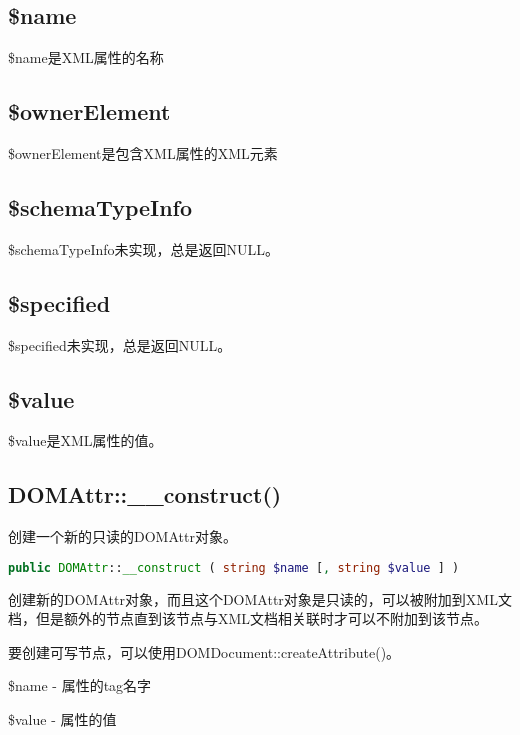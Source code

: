 \subsection{\$name}

\$name是XML属性的名称

\subsection{\$ownerElement}

\$ownerElement是包含XML属性的XML元素

\subsection{\$schemaTypeInfo}

\$schemaTypeInfo未实现，总是返回NULL。

\subsection{\$specified}

\$specified未实现，总是返回NULL。

\subsection{\$value}

\$value是XML属性的值。

\subsection{DOMAttr::\_\_construct()}

创建一个新的只读的DOMAttr对象。

\begin{lstlisting}[language=PHP]
public DOMAttr::__construct ( string $name [, string $value ] )
\end{lstlisting}

创建新的DOMAttr对象，而且这个DOMAttr对象是只读的，可以被附加到XML文档，但是额外的节点直到该节点与XML文档相关联时才可以不附加到该节点。 


要创建可写节点，可以使用DOMDocument::createAttribute()。

\begin{compactitem}
\item \$name - 属性的tag名字
\item \$value - 属性的值
\end{compactitem}



